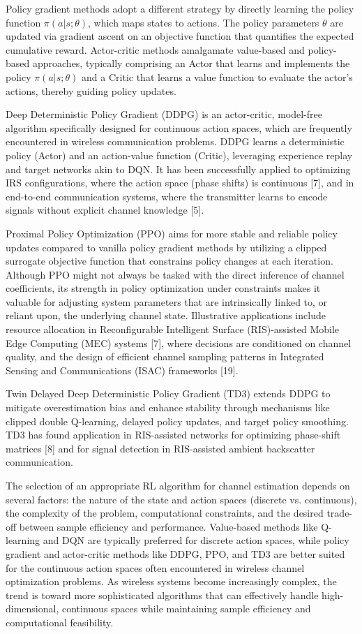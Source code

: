 \documentclass[journal,twocolumn]{IEEEtran}
\begin{document}
Policy gradient methods adopt a different strategy by directly learning the policy function $\pi(a|s; \theta)$, which maps states to actions. The policy parameters $\theta$ are updated via gradient ascent on an objective function that quantifies the expected cumulative reward. Actor-critic methods amalgamate value-based and policy-based approaches, typically comprising an Actor that learns and implements the policy $\pi(a|s; \theta)$ and a Critic that learns a value function to evaluate the actor's actions, thereby guiding policy updates.

Deep Deterministic Policy Gradient (DDPG) is an actor-critic, model-free algorithm specifically designed for continuous action spaces, which are frequently encountered in wireless communication problems. DDPG learns a deterministic policy (Actor) and an action-value function (Critic), leveraging experience replay and target networks akin to DQN. It has been successfully applied to optimizing IRS configurations, where the action space (phase shifts) is continuous [7], and in end-to-end communication systems, where the transmitter learns to encode signals without explicit channel knowledge [5].

Proximal Policy Optimization (PPO) aims for more stable and reliable policy updates compared to vanilla policy gradient methods by utilizing a clipped surrogate objective function that constrains policy changes at each iteration. Although PPO might not always be tasked with the direct inference of channel coefficients, its strength in policy optimization under constraints makes it valuable for adjusting system parameters that are intrinsically linked to, or reliant upon, the underlying channel state. Illustrative applications include resource allocation in Reconfigurable Intelligent Surface (RIS)-assisted Mobile Edge Computing (MEC) systems [7], where decisions are conditioned on channel quality, and the design of efficient channel sampling patterns in Integrated Sensing and Communications (ISAC) frameworks [19].

Twin Delayed Deep Deterministic Policy Gradient (TD3) extends DDPG to mitigate overestimation bias and enhance stability through mechanisms like clipped double Q-learning, delayed policy updates, and target policy smoothing. TD3 has found application in RIS-assisted networks for optimizing phase-shift matrices [8] and for signal detection in RIS-assisted ambient backscatter communication.

The selection of an appropriate RL algorithm for channel estimation depends on several factors: the nature of the state and action spaces (discrete vs. continuous), the complexity of the problem, computational constraints, and the desired trade-off between sample efficiency and performance. Value-based methods like Q-learning and DQN are typically preferred for discrete action spaces, while policy gradient and actor-critic methods like DDPG, PPO, and TD3 are better suited for the continuous action spaces often encountered in wireless channel optimization problems. As wireless systems become increasingly complex, the trend is toward more sophisticated algorithms that can effectively handle high-dimensional, continuous spaces while maintaining sample efficiency and computational feasibility.
\end{document}
